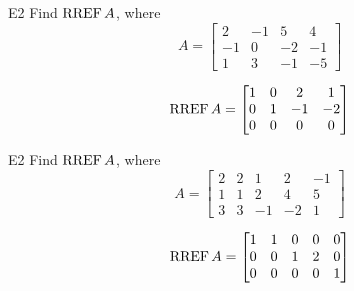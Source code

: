 \begin{problem}{E2}
Find \(\operatorname{RREF} A\), where
\[
  A =
  \begin{bmatrix}
    2 & -1 & 5 & 4 \\
    -1 & 0 & -2 & -1 \\
    1 & 3 & -1 & -5
  \end{bmatrix}
\]
\end{problem}
\begin{solution}
\[
  \operatorname{RREF} A =
  \begin{bmatrix}
    1 & 0 & 2 & 1 \\
    0 & 1 & -1 & -2 \\
    0 & 0 & 0 & 0
  \end{bmatrix}
\]
\end{solution}

\begin{problem}{E2}
Find \(\operatorname{RREF} A\), where
\[
  A =
  \begin{bmatrix}
    2 & 2 & 1 & 2 & -1 \\
    1 & 1 & 2 & 4 & 5 \\
    3 & 3 & -1 & -2 & 1
  \end{bmatrix}
\]
\end{problem}
\begin{solution}
\[
  \operatorname{RREF} A =
  \begin{bmatrix}
    1 & 1 & 0 & 0 & 0 \\
    0 & 0 & 1 & 2 & 0 \\
    0 & 0 & 0 & 0 & 1
  \end{bmatrix}
\]
\end{solution}
